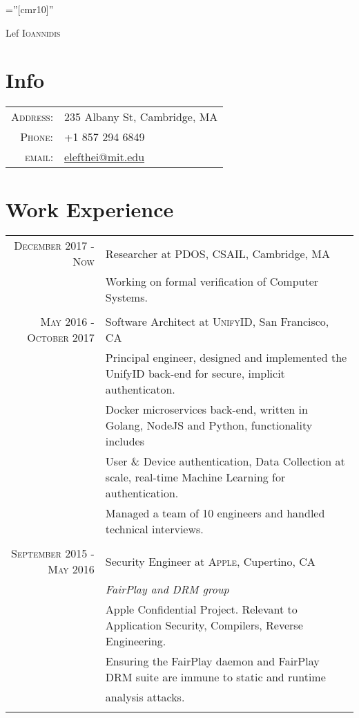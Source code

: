 \documentclass[lettersize,10pt]{article}
\begin{document}
\pagestyle{empty} %
\font\fb=''[cmr10]'' %

\par{\centering
		{\Huge Lef \textsc{Ioannidis}
	}
	\bigskip\par}

\section{Info}

\begin{tabular}{rl}

    \textsc{Address:}   & 235 Albany St, Cambridge, MA \\
    \textsc{Phone:}     & +1 857 294 6849\\
    \textsc{email:}     & \href{mailto:elefthei@mit.edu}{elefthei@mit.edu}
\end{tabular}

\section{Work Experience}
\begin{tabular}{rl}
\textsc{ December 2017 - Now} & Researcher at \textsc{PDOS, CSAIL}, Cambridge, MA\\
&\footnotesize{Working on formal verification of Computer Systems.}\\\multicolumn{2}{c}{} \\
\textsc{ May 2016 - October 2017} & Software Architect at \textsc{UnifyID}, San Francisco, CA\\

&\footnotesize{Principal engineer, designed and implemented the UnifyID back-end for secure, implicit authenticaton. }\\
&\footnotesize{Docker microservices back-end, written in Golang, NodeJS and Python, functionality includes }\\
&\footnotesize{User \& Device authentication, Data Collection at scale, real-time Machine Learning for authentication. }\\
&\footnotesize{Managed a team of 10 engineers and handled technical interviews.}\\\multicolumn{2}{c}{} \\

\textsc{September 2015 - May 2016} & Security Engineer at \textsc{Apple}, Cupertino, CA \\&\emph{FairPlay and DRM group}\\
&\footnotesize{Apple Confidential Project. Relevant to Application Security, Compilers, Reverse Engineering.} \\
&\footnotesize{Ensuring the FairPlay daemon and FairPlay DRM suite are immune to static and runtime }\\
&\footnotesize{analysis attacks.}\\\multicolumn{2}{c}{} \\
\end{tabular}
\end{document}
